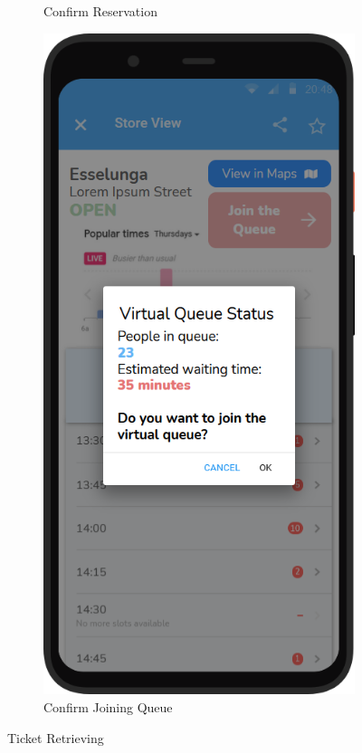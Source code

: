 \begin{figure}[H]
\begin{subfigure}{.33\textwidth}
        \caption{Confirm Reservation}
        \label{fig:screen6}
    \end{subfigure}
    \begin{subfigure}{.33\textwidth}
        \centering
        \includegraphics[width=.95\linewidth]{Images/screen_07.png}
        \caption{Confirm Joining Queue}
        \label{fig:screen7}
    \end{subfigure}
    \caption{Ticket Retrieving}
\end{figure}


